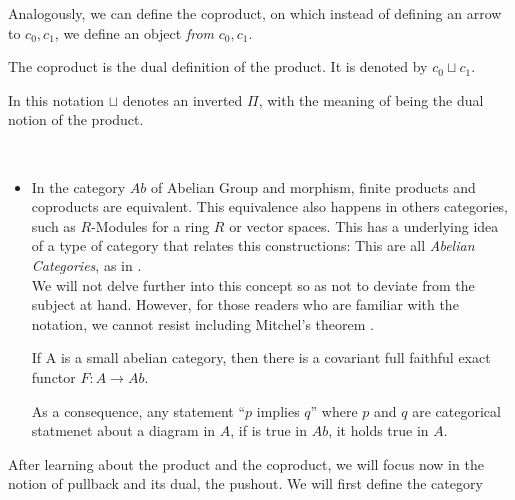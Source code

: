 Analogously, we can define the coproduct, on which instead of defining an arrow to $c_0, c_1$, we define an object \emph{from} $c_0,c_1$. 
\begin{definition}
  The coproduct is the dual definition of the product. It is denoted by $c_0 \sqcup c_1$.
\end{definition}
 In this notation $\sqcup$ denotes an inverted $\Pi$, with the meaning of being the dual notion of the product.
\begin{example}\ 
  \begin{itemize}
  \item In the category $Ab$ of Abelian Group and morphism, finite products and coproducts are equivalent. This equivalence also happens in others categories, such as $R$-Modules for a ring $R$ or vector spaces. This has a underlying idea of a type of category that relates this constructions: This are all \emph{Abelian Categories}, as in \cite[Section 5.5]{rotman2008introduction}.\\

    We will not delve further into this concept so as not to deviate from the subject at hand. However, for those readers who are familiar with the notation, we cannot resist including Mitchel's theorem\cite[Chapter IV]{mitchell1965theory} .

    \begin{theorem} If A is a small abelian category, then there is a covariant full faithful exact functor $F : A \to Ab$.
    \end{theorem}

    As a consequence, any statement ``$p$ implies $q$'' where $p$ and $q$ are categorical statmenet about a diagram in $A$, if is true in  $Ab$, it holds true in $A$.
  \end{itemize}
\end{example}





After learning about the product and the coproduct, we will focus now in the notion of pullback and its dual, the pushout. We will first define the category

